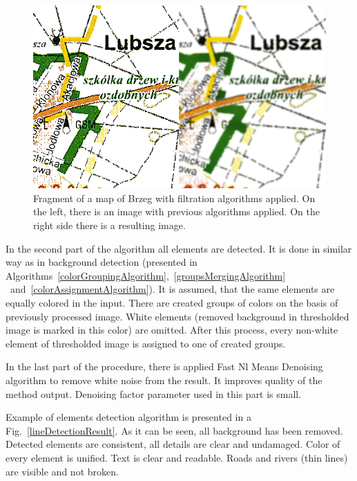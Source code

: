 \documentclass[a4paper,onecolumn,oneside,12pt]{memoir}
\begin{document}
\begin{figure}[!ht]
\begin{center}
\includegraphics[scale=0.6]{images/filtrationResult.png}
\caption{Fragment of a map of Brzeg with filtration algorithms applied.
On the left, there is an image with previous algorithms applied. On the right side there is a
resulting image.}
\label{contoursFiltrationResult}
\end{center}
\end{figure}

In the second part of the algorithm all elements are detected. It is done in similar way as in
background detection (presented in Algorithms~\ref{colorGroupingAlgorithm},~\ref{groupsMergingAlgorithm}
~and~\ref{colorAssignmentAlgorithm}). It is assumed, that the same elements are equally colored in
the input. There are created groups of colors on the basis of previously processed image. White
elements  (removed background in thresholded image is marked in this color) are omitted. After this
process, every non-white element of thresholded image is assigned to one of created groups.

In the last part of the procedure, there is applied Fast Nl Means Denoising algorithm to remove
white noise from the result. It improves quality of the method output. Denoising factor parameter
used in this part is small.

Example of elements detection algorithm is presented in a Fig.~\ref{lineDetectionResult}. As it can
be seen, all background has been removed. Detected elements are consistent, all details are clear
and undamaged. Color of every element is unified. Text is clear and readable. Roads and rivers
 (thin lines) are visible and not broken.
\end{document}
